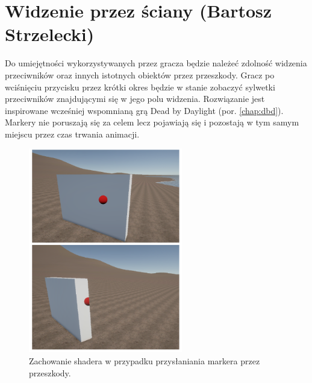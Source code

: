\section{Widzenie przez ściany (Bartosz Strzelecki)}

Do umiejętności wykorzystywanych przez gracza będzie należeć zdolność widzenia przeciwników oraz innych istotnych obiektów przez przeszkody.
Gracz po wciśnięciu przycisku przez krótki okres będzie w stanie zobaczyć sylwetki przeciwników znajdującymi się w jego polu widzenia.
Rozwiązanie jest inspirowane wcześniej wspomnianą grą Dead by Daylight (por. \ref{chap:dbd}). Markery nie poruszają się za celem lecz pojawiają się i pozostają w tym samym miejscu przez czas trwania animacji.

\begin{figure}[h]
\centering
\includegraphics[width=0.6\textwidth]{images/shader}
\caption{Zachowanie shadera w przypadku przysłaniania markera przez przeszkody.}
\end{figure}

